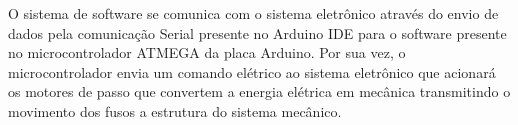 O sistema de software se comunica com o sistema eletrônico através do envio de dados pela comunicação 
Serial presente no Arduino IDE para o software presente no microcontrolador ATMEGA da placa Arduino. 
Por sua vez, o microcontrolador envia um comando elétrico ao sistema eletrônico que acionará os motores 
de passo que convertem a energia elétrica em mecânica transmitindo o movimento dos fusos a estrutura do 
sistema mecânico.